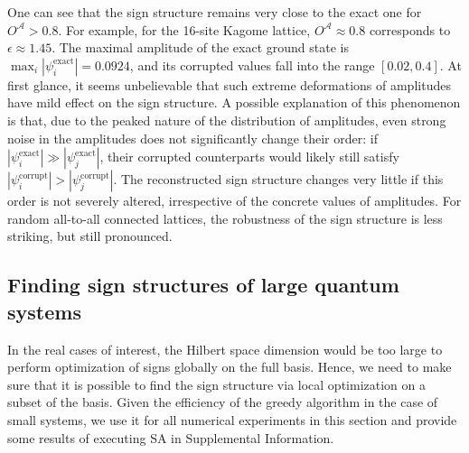 \noindent One can see that the sign structure remains very close to the exact one for $O^\mathcal{A} > 0.8$. For example, for the 16-site Kagome lattice, $O^\mathcal{A} \approx 0.8$ corresponds to $\epsilon \approx 1.45$. The maximal amplitude of the exact ground state is $\max_i |\psi^\mathrm{exact}_i| = 0.0924$, and its corrupted values fall into the range $[0.02, 0.4]$. At first glance, it seems unbelievable that such extreme deformations of amplitudes have mild effect on the sign structure. A possible explanation of this phenomenon is that, due to the peaked nature of the distribution of amplitudes, even strong noise in the amplitudes does not significantly change their order: if $|\psi^\mathrm{exact}_i| \gg |\psi^\mathrm{exact}_j|$, their corrupted counterparts would likely still satisfy $|\psi^\mathrm{corrupt}_i| > |\psi^\mathrm{corrupt}_j|$. The reconstructed sign structure changes very little if this order is not severely altered, irrespective of the concrete values of amplitudes. For random all-to-all connected lattices, the robustness of the sign structure is less striking, but still pronounced.


\subsection{Finding sign structures of large quantum systems}

In the real cases of interest, the Hilbert space dimension would be too large to perform optimization of signs globally on the full basis. Hence, we need to make sure that it is possible to find the sign structure via local optimization on a subset of the basis. Given the efficiency of the greedy algorithm in the case of small systems, we use it for all numerical experiments in this section and provide some results of executing SA in Supplemental Information.

